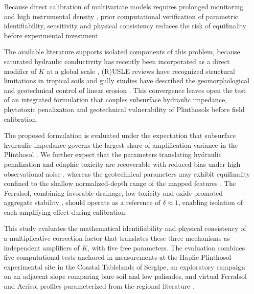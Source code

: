 \documentclass[preprint,review,12pt,authoryear]{elsarticle}
\begin{document}
Because direct calibration of multivariate models requires prolonged monitoring and high instrumental density \citep{alewell_et_al_2019}, prior computational verification of parametric identifiability, sensitivity and physical consistency reduces the risk of equifinality before experimental investment \citep{saltelli_et_al_2004,beven_freer_2001,her_chaubey_2015}.

The available literature supports isolated components of this problem, because saturated hydraulic conductivity has recently been incorporated as a direct modifier of $K$ at a global scale \citep{gupta_et_al_2024}, (R)USLE reviews have recognized structural limitations in tropical soils and gully studies have described the geomorphological and geotechnical control of linear erosion \citep{benavidez_et_al_2018,alewell_et_al_2019,poesen_2018,vanmaercke_et_al_2021}. This convergence leaves open the test of an integrated formulation that couples subsurface hydraulic impedance, phytotoxic penalization and geotechnical vulnerability of Plinthosols before field calibration.

The proposed formulation is evaluated under the expectation that subsurface hydraulic impedance governs the largest share of amplification variance in the Plinthosol \citep{gupta_et_al_2024}. We further expect that the parameters translating hydraulic penalization and edaphic toxicity are recoverable with reduced bias under high observational noise \citep{cheviron_et_al_2010,rao_et_al_2016}, whereas the geotechnical parameters may exhibit equifinality confined to the shallow normalized-depth range of the mapped features \citep{gudino_elizondo_et_al_2018}. The Ferralsol, combining favorable drainage, low toxicity and oxide-promoted aggregate stability \citep{barthes_roose_2002}, should operate as a reference of $\delta \approx 1$, enabling isolation of each amplifying effect during calibration.

This study evaluates the mathematical identifiability and physical consistency of a multiplicative correction factor that translates these three mechanisms as independent amplifiers of $K$, with five free parameters. The evaluation combines five computational tests anchored in measurements at the Haplic Plinthosol experimental site in the Coastal Tablelands of Sergipe, an exploratory campaign on an adjacent slope comparing bare soil and low palisades, and virtual Ferralsol and Acrisol profiles parameterized from the regional literature \citep{silva_et_al_2009,bertoni_lombardi_neto_2017}.
\end{document}
